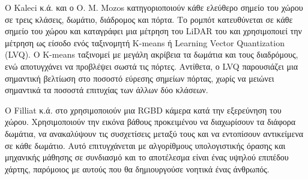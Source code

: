 Ο Kaleci κ.ά. \cite{kaleci2015} και ο O. M. Mozos \cite{mozos2008} κατηγοριοποιούν κάθε ελεύθερο σημείο του χώρου σε τρεις κλάσεις, δωμάτιο, διάδρομος και πόρτα. Το ρομπότ κατευθύνεται σε κάθε σημείο του χώρου και καταγράφει μια μέτρηση του LiDAR του και χρησιμοποιεί την μέτρηση ως είσοδο ενός ταξινομητή K-means ή Learning Vector Quantization (LVQ). Ο K-means ταξινομεί με μεγάλη ακρίβεια τα δωμάτια και τους διαδρόμους, ενώ αποτυγχάνει να προβλέψει σωστά τις πόρτες. Αντίθετα, ο LVQ παρουσιάζει μια σημαντική βελτίωση στο ποσοστό εύρεσης σημείων πόρτας, χωρίς να μειώνει σημαντικά τα ποσοστά επιτυχίας των άλλων δύο κλάσεων.

Ο Filliat κ.ά. στο \cite{filliat2012} χρησιμοποιούν μια RGBD κάμερα κατά την εξερεύνηση του χώρου. Χρησιμοποιούν την εικόνα βάθους προκειμένου να διαχωρίσουν τα διάφορα δωμάτια, να ανακαλύψουν τις συσχετίσεις μεταξύ τους και να εντοπίσουν αντικείμενα σε κάθε δωμάτιο. Αυτό επιτυγχάνεται με αλγορίθμους υπολογιστικής όρασης και μηχανικής μάθησης σε συνδιασμό και το αποτέλεσμα είναι ένας υψηλού επιπέδου χάρτης, παρόμοιος με αυτούς που θα δημιουργούσε νοητικά ένας άνθρωπός.



